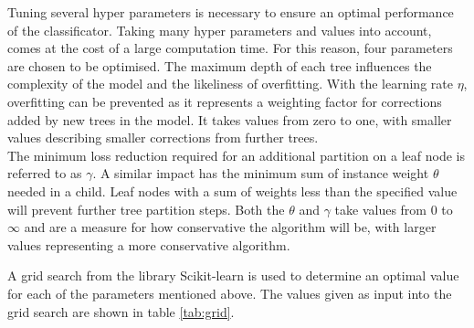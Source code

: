 Tuning several hyper parameters is necessary to ensure an optimal performance of the classificator. Taking many hyper parameters and values into account, comes at the
cost of a large computation time. For this reason, four parameters are chosen to be optimised. The maximum depth of each tree influences the
complexity of the model and the likeliness of overfitting. With the learning rate $\eta$, overfitting can be prevented as it represents a weighting factor for
corrections added by new trees in the model. It takes values from zero to one, with smaller values describing smaller corrections from further trees. \\
The minimum loss reduction required for an additional partition on a leaf node is referred to as $\gamma$. A similar impact has the minimum sum of instance weight $\theta$
needed in a child. Leaf nodes with a sum of weights less than the specified value will prevent further tree partition steps.
Both the $\theta$ and $\gamma$ take values from 0 to $\infty$ and are a measure for how conservative the algorithm will be, with larger values representing a more
conservative algorithm.

A grid search from the library Scikit-learn \cite{scikit} is used to determine an optimal value for each of the parameters mentioned above. The values given as input into the grid search
are shown in table \ref{tab:grid}.

